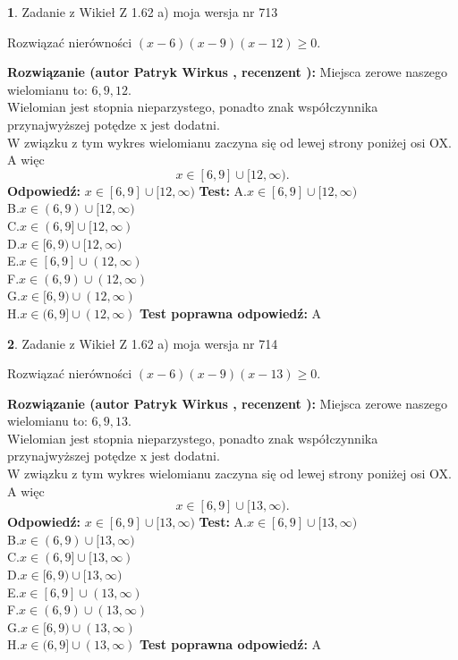 \documentclass[12pt, a4paper]{article}
\theoremstyle{definition} %
\newtheorem{zad}{}
\newcommand{\zadStart}[1]{\begin{zad}#1\newline}
\newcommand{\zadStop}{\end{zad}}
\newcommand{\rozwStart}[2]{\noindent \textbf{Rozwiązanie (autor #1 , recenzent #2): }\newline}
\newcommand{\rozwStop}{\newline}
\newcommand{\odpStart}{\noindent \textbf{Odpowiedź:}\newline}
\newcommand{\odpStop}{\newline}
\newcommand{\testStart}{\noindent \textbf{Test:}\newline}
\newcommand{\testStop}{\newline}
\newcommand{\kluczStart}{\noindent \textbf{Test poprawna odpowiedź:}\newline}
\newcommand{\kluczStop}{\newline}
\begin{document}
\zadStart{Zadanie z Wikieł Z 1.62 a) moja wersja nr 713}

Rozwiązać nierówności $(x-6)(x-9)(x-12)\ge0$.
\zadStop
\rozwStart{Patryk Wirkus}{}
Miejsca zerowe naszego wielomianu to: $6, 9, 12$.\\
Wielomian jest stopnia nieparzystego, ponadto znak współczynnika przy\linebreak najwyższej potędze x jest dodatni.\\ W związku z tym wykres wielomianu zaczyna się od lewej strony poniżej osi OX. A więc $$x \in [6,9] \cup [12,\infty).$$
\rozwStop
\odpStart
$x \in [6,9] \cup [12,\infty)$
\odpStop
\testStart
A.$x \in [6,9] \cup [12,\infty)$\\
B.$x \in (6,9) \cup [12,\infty)$\\
C.$x \in (6,9] \cup [12,\infty)$\\
D.$x \in [6,9) \cup [12,\infty)$\\
E.$x \in [6,9] \cup (12,\infty)$\\
F.$x \in (6,9) \cup (12,\infty)$\\
G.$x \in [6,9) \cup (12,\infty)$\\
H.$x \in (6,9] \cup (12,\infty)$
\testStop
\kluczStart
A
\kluczStop



\zadStart{Zadanie z Wikieł Z 1.62 a) moja wersja nr 714}

Rozwiązać nierówności $(x-6)(x-9)(x-13)\ge0$.
\zadStop
\rozwStart{Patryk Wirkus}{}
Miejsca zerowe naszego wielomianu to: $6, 9, 13$.\\
Wielomian jest stopnia nieparzystego, ponadto znak współczynnika przy\linebreak najwyższej potędze x jest dodatni.\\ W związku z tym wykres wielomianu zaczyna się od lewej strony poniżej osi OX. A więc $$x \in [6,9] \cup [13,\infty).$$
\rozwStop
\odpStart
$x \in [6,9] \cup [13,\infty)$
\odpStop
\testStart
A.$x \in [6,9] \cup [13,\infty)$\\
B.$x \in (6,9) \cup [13,\infty)$\\
C.$x \in (6,9] \cup [13,\infty)$\\
D.$x \in [6,9) \cup [13,\infty)$\\
E.$x \in [6,9] \cup (13,\infty)$\\
F.$x \in (6,9) \cup (13,\infty)$\\
G.$x \in [6,9) \cup (13,\infty)$\\
H.$x \in (6,9] \cup (13,\infty)$
\testStop
\kluczStart
A
\kluczStop
\end{document}
